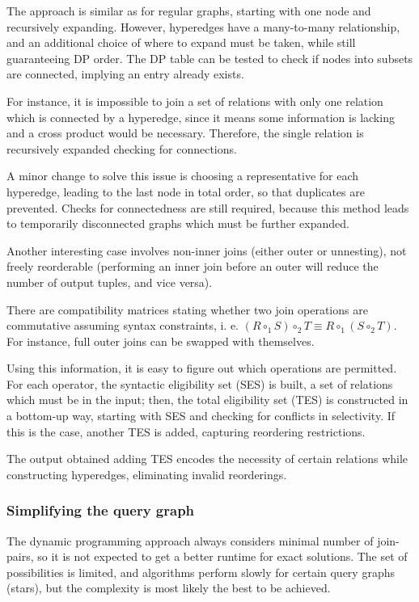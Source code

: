 The approach is similar as for regular graphs, starting with one node and recursively expanding. However, hyperedges have a many-to-many relationship, and an additional choice of where to expand must be taken, while still guaranteeing DP order. The DP table can be tested to check if nodes into subsets are connected, implying an entry already exists. 

For instance, it is impossible to join a set of relations with only one relation which is connected by a hyperedge, since it means some information is lacking and a cross product would be necessary. Therefore, the single relation is recursively expanded checking for connections.

A minor change to solve this issue is choosing a representative for each hyperedge, leading to the last node in total order, so that duplicates are prevented. Checks for connectedness are still required, because this method leads to temporarily disconnected graphs which must be further expanded.

Another interesting case involves non-inner joins (either outer or unnesting), not freely reorderable (performing an inner join before an outer will reduce the number of output tuples, and vice versa). 

There are compatibility matrices stating whether two join operations are commutative assuming syntax constraints, i. e. $(R \circ_1 S) \circ_2 T \equiv R \circ_1 (S \circ_2 T)$. For instance, full outer joins can be swapped with themselves. 

Using this information, it is easy to figure out which operations are permitted. For each operator, the syntactic eligibility set (SES) is built, a set of relations which must be in the input; then, the total eligibility set (TES) is constructed in a bottom-up way, starting with SES and checking for conflicts in selectivity. If this is the case, another TES is added, capturing reordering restrictions. 

The output obtained adding TES encodes the necessity of certain relations while constructing hyperedges, eliminating invalid reorderings.

\subsubsection{Simplifying the query graph}
The dynamic programming approach always considers minimal number of join-pairs, so it is not expected to get a better runtime for exact solutions. The set of possibilities is limited, and algorithms perform slowly for certain query graphs (stars), but the complexity is most likely the best to be achieved.

